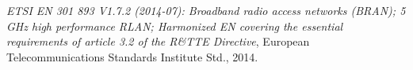 %

\begin{thebibliography}{99.}%
\emph{ETSI EN 301 893 V1.7.2 (2014-07): Broadband radio access networks (BRAN); 5 GHz high performance RLAN; Harmonized EN covering the essential requirements of article 3.2 of the R\&TTE Directive}, European Telecommunications Standards Institute Std., 2014.
\end{thebibliography}
